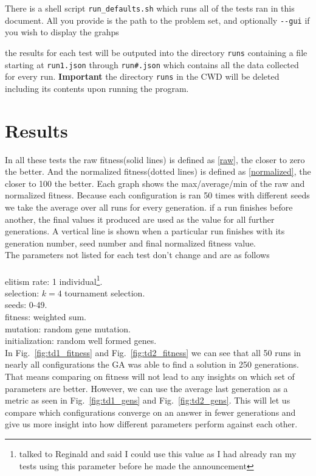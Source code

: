 \documentclass[conference]{IEEEtran}
\begin{document}
There is a shell script \texttt{run\_defaults.sh} which runs all of the tests ran in this document. All you provide is the path to the problem set, and optionally \texttt{-{}-gui} if you wish to display the grahps\vspace{8pt}

the results for each test will be outputed into the directory \texttt{runs} containing a file starting at \texttt{run1.json} through \texttt{run\#.json} which contains all the data collected for every run. \textbf{Important} the directory \texttt{runs} in the CWD will be deleted including its contents upon running the program.

\section{Results}

In all these tests the raw fitness(solid lines) is defined as \eqref{raw}, the closer to zero the better. And the normalized fitness(dotted lines) is defined as \eqref{normalized}, the closer to 100 the better. Each graph shows the max/average/min of the raw and normalized fitness. Because each configuration is ran 50 times with different seeds we take the average over all runs for every generation. if a run finishes before another, the final values it produced are used as the value for all further generations. A vertical line is shown when a particular run finishes with its generation number, seed number and final normalized fitness value.\\

The parameters not listed for each test don't change and are as follows\\\\
elitism rate: 1 individual\footnote{talked to Reginald and said I could use this value as I had already ran my tests using this parameter before he made the announcement}.\\
selection: $k=4$ tournament selection.\\
seeds: 0-49.\\
fitness: weighted sum.\\
mutation: random gene mutation.\\
initialization: random well formed genes.\\

In Fig.~\ref{fig:td1_fitness} and Fig.~\ref{fig:td2_fitness} we can see that all 50 runs in nearly all configurations the GA was able to find a solution in 250 generations. That means comparing on fitness will not lead to any insights on which set of parameters are better. However, we can use the average last generation as a metric as seen in Fig.~\ref{fig:td1_gens} and Fig.~\ref{fig:td2_gens}. This will let us compare which configurations converge on an answer in fewer generations and give us more insight into how different parameters perform against each other.\\
\end{document}

